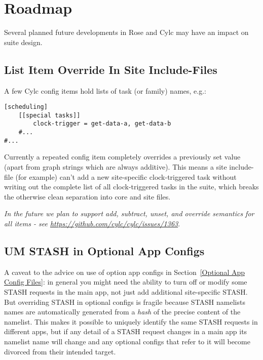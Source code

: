 \section{Roadmap}

Several planned future developments in Rose and Cylc may have an impact on
suite design.

\subsection{List Item Override In Site Include-Files}
\label{List Item Override In Site Include-Files}

A few Cylc config items hold lists of task (or family) names, e.g.:

\lstset{language=suiterc}
\begin{lstlisting}
[scheduling]
    [[special tasks]]
        clock-trigger = get-data-a, get-data-b
    #...
#...
\end{lstlisting}

Currently a repeated config item completely overrides a previously set value
(apart from graph strings which are always additive). This means a site
include-file (for example) can't add a new site-specific clock-triggered task
without writing out the complete list of all clock-triggered tasks in the
suite, which breaks the otherwise clean separation into core and site files.

{\em In the future we plan to support add, subtract, unset, and override
semantics for all items - see \url{https://github.com/cylc/cylc/issues/1363}}.

\subsection{UM STASH in Optional App Configs}
\label{UM STASH in Optional App Configs}

A caveat to the advice on use of option app configs in Section~\ref{Optional
App Config Files}: in general you might need the ability to turn off or modify
some STASH requests in the main app, not just add additional site-specific
STASH. But overriding STASH in optional configs is fragile because STASH
namelists names are automatically generated from a {\em hash} of the precise
content of the namelist. This makes it possible to uniquely identify the same
STASH requests in different apps, but if any detail of a STASH request changes
in a main app its namelist name will change and any optional configs that refer
to it will become divorced from their intended target.


